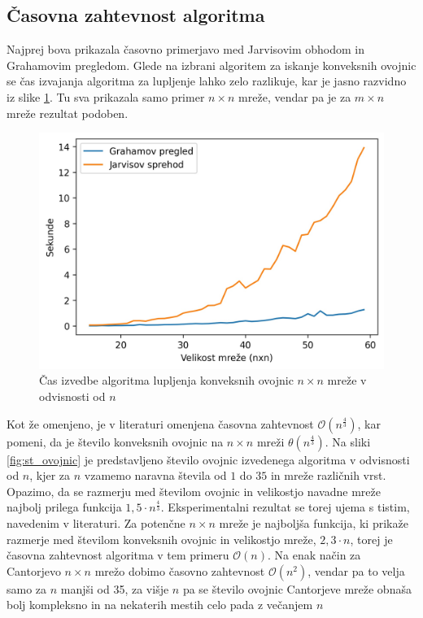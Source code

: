 \documentclass[a4paper]{article}
\begin{document}
\newpage
\subsection{Časovna zahtevnost algoritma}
Najprej bova prikazala časovno primerjavo med Jarvisovim obhodom in Grahamovim pregledom. Glede na izbrani algoritem za iskanje konveksnih ovojnic se čas izvajanja algoritma za lupljenje
lahko zelo razlikuje, kar je jasno razvidno iz slike \ref{fig:cas}. Tu sva prikazala samo primer $n \times n$ mreže, vendar pa je za $m \times n$ mreže rezultat podoben.

\begin{figure}[!h]
	\centering
	\caption{Čas izvedbe algoritma lupljenja konveksnih ovojnic $n \times n$ mreže v odvisnosti od $n$}
	\label{fig:cas}
	\includegraphics[scale=0.7]{slike/cas.jpg}
\end{figure}

Kot že omenjeno, je v literaturi omenjena časovna zahtevnost $\mathcal{O}(n ^ \frac{4}{3})$, kar pomeni, da je število konveksnih ovojnic na $n \times n$ mreži $\theta(n ^ \frac{4}{3})$.
Na sliki \ref{fig:st_ovojnic} je predstavljeno število ovojnic izvedenega algoritma v odvisnosti od $n$, kjer za $n$ vzamemo naravna števila od $1$ do $35$ in mreže različnih vrst. 
Opazimo, da se razmerju med številom ovojnic in velikostjo navadne mreže najbolj prilega funkcija $1,5 \cdot n ^ \frac{4}{3}$. Eksperimentalni rezultat se torej ujema s tistim, navedenim v 
literaturi. Za potenčne $n \times n$ mreže je najboljša funkcija, ki prikaže razmerje med številom konveksnih ovojnic in velikostjo mreže, $2,3 \cdot n$, torej je časovna zahtevnost algoritma
v tem primeru $\mathcal{O}(n)$. Na enak način za Cantorjevo $n \times n$ mrežo dobimo časovno zahtevnost $\mathcal{O}(n^2)$, vendar pa to velja samo za $n$ manjši od 35, za višje $n$ pa se
število ovojnic Cantorjeve mreže obnaša bolj kompleksno in na nekaterih mestih celo pada z večanjem $n$
\end{document}
